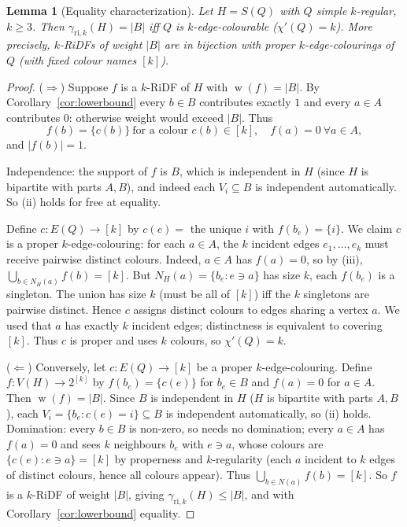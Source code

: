 \documentclass[11pt,a4paper]{article}
\theoremstyle{plain}
\newtheorem{lemma}[theorem]{Lemma}
\theoremstyle{definition}
\DeclareMathOperator{\weight}{w}
\newcommand{\gri}{\gamma_{\mathrm{ri},k}}
\newcommand{\setK}{[k]}
\begin{document}
\begin{lemma}[Equality characterization]\label{lem:equality}
Let $H=S(Q)$ with $Q$ simple $k$-regular, $k\ge3$. Then $\gri(H)=|B|$ iff $Q$ is $k$-edge-colourable ($\chi'(Q)=k$). More precisely, $k$-RiDFs of weight $|B|$ are in bijection with proper $k$-edge-colourings of $Q$ (with fixed colour names $\setK$).
\end{lemma}
\begin{proof}
($\Rightarrow$) Suppose $f$ is a $k$-RiDF of $H$ with $\weight(f)=|B|$.
By Corollary~\ref{cor:lowerbound} every $b\in B$ contributes exactly $1$ and every $a\in A$ contributes $0$: otherwise weight would exceed $|B|$.
Thus
\[
f(b)=\{c(b)\}\ \text{for a colour }c(b)\in\setK,\quad f(a)=0\ \forall a\in A,
\]
and $|f(b)|=1$.

Independence: the support of $f$ is $B$, which is independent in $H$ (since $H$ is bipartite with parts $A,B$), and indeed each $V_{i}\subseteq B$ is independent automatically. So (ii) holds for free at equality.

Define $c\colon E(Q)\to\setK$ by $c(e)=$ the unique $i$ with $f(b_{e})=\{i\}$.
We claim $c$ is a proper $k$-edge-colouring: for each $a\in A$, the $k$ incident edges $e_{1},\dots,e_{k}$ must receive pairwise distinct colours.
Indeed, $a\in A$ has $f(a)=0$, so by (iii), $\bigcup_{b\in N_{H}(a)}f(b)=\setK$.
But $N_{H}(a)=\{b_{e}:e\ni a\}$ has size $k$, each $f(b_{e})$ is a singleton.
The union has size $k$ (must be all of $\setK$) iff the $k$ singletons are pairwise distinct. Hence $c$ assigns distinct colours to edges sharing a vertex $a$. We used that $a$ has exactly $k$ incident edges; distinctness is equivalent to covering $\setK$.
Thus $c$ is proper and uses $k$ colours, so $\chi'(Q)=k$.

($\Leftarrow$) Conversely, let $c\colon E(Q)\to\setK$ be a proper $k$-edge-colouring.
Define $f\colon V(H)\to2^{\setK}$ by $f(b_{e})=\{c(e)\}$ for $b_{e}\in B$ and $f(a)=0$ for $a\in A$. Then $\weight(f)=|B|$. Since $B$ is independent in $H$ ($H$ is bipartite with parts $A,B$), each $V_{i}=\{b_{e}:c(e)=i\}\subseteq B$ is independent automatically, so (ii) holds. Domination: every $b\in B$ is non-zero, so needs no domination; every $a\in A$ has $f(a)=0$ and sees $k$ neighbours $b_{e}$ with $e\ni a$, whose colours are $\{c(e):e\ni a\}=\setK$ by properness and $k$-regularity (each $a$ incident to $k$ edges of distinct colours, hence all colours appear). Thus $\bigcup_{b\in N(a)}f(b)=\setK$. So $f$ is a $k$-RiDF of weight $|B|$, giving $\gri(H)\le|B|$, and with Corollary~\ref{cor:lowerbound} equality.
\end{proof}
\end{document}
